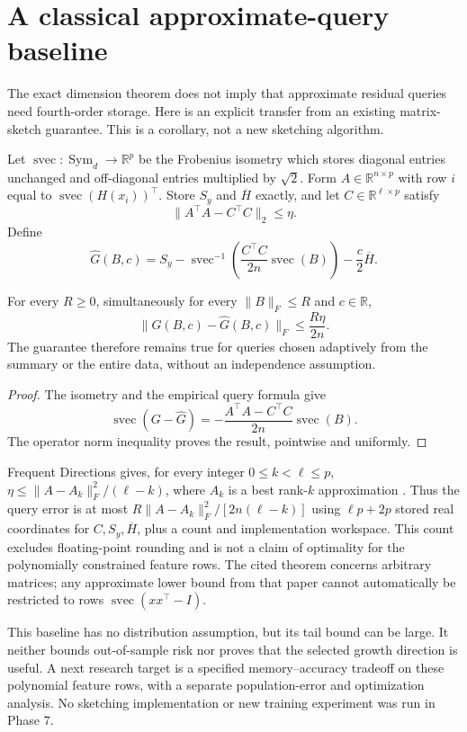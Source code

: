 \section{A classical approximate-query baseline}
\label{sec:sketch-baseline}
The exact dimension theorem does not imply that approximate residual queries
need fourth-order storage. Here is an explicit transfer from an existing
matrix-sketch guarantee. This is a corollary, not a new sketching algorithm.

Let $\operatorname{svec}:\operatorname{Sym}_d\to\mathbb R^p$ be the
Frobenius isometry which stores diagonal entries unchanged and off-diagonal
entries multiplied by $\sqrt2$. Form $A\in\mathbb R^{n\times p}$ with
row $i$ equal to $\operatorname{svec}(H(x_i))^\top$. Store $S_y$ and
$\overline H$ exactly, and let $C\in\mathbb R^{\ell\times p}$ satisfy
\[
 \|A^\top A-C^\top C\|_2\le\eta.
\]
Define
\[
 \widehat G(B,c)=S_y-
 \operatorname{svec}^{-1}\!\left(\frac{C^\top C}{2n}
                       \operatorname{svec}(B)\right)
 -\frac c2\overline H.
\]
\begin{proposition}
For every $R\ge0$, simultaneously for every $\|B\|_F\le R$ and
$c\in\mathbb R$,
\[
 \|G(B,c)-\widehat G(B,c)\|_F\le\frac{R\eta}{2n}.
\]
The guarantee therefore remains true for queries chosen adaptively from the
summary or the entire data, without an independence assumption.
\end{proposition}
\begin{proof}
The isometry and the empirical query formula give
\[
 \operatorname{svec}(G-\widehat G)
 =-\frac{A^\top A-C^\top C}{2n}\operatorname{svec}(B).
\]
The operator norm inequality proves the result, pointwise and uniformly.
\end{proof}

Frequent Directions gives, for every integer $0\le k<\ell\le p$,
$\eta\le\|A-A_k\|_F^2/(\ell-k)$, where $A_k$ is a best rank-$k$
approximation \cite[Theorem 1.1]{p7ghashami2015}. Thus the query error is
at most $R\|A-A_k\|_F^2/[2n(\ell-k)]$ using $\ell p+2p$ stored real
coordinates for $C,S_y,\overline H$, plus a count and implementation
workspace. This count excludes floating-point rounding and is not a
claim of optimality for the polynomially constrained feature rows.
The cited theorem concerns arbitrary matrices; any approximate lower
bound from that paper cannot automatically be restricted to rows
$\operatorname{svec}(xx^\top-I)$.

This baseline has no distribution assumption, but its tail bound can be
large. It neither bounds out-of-sample risk nor proves that the selected
growth direction is useful. A next research target is a specified
memory--accuracy tradeoff on these polynomial feature rows, with a
separate population-error and optimization analysis. No sketching
implementation or new training experiment was run in Phase 7.
